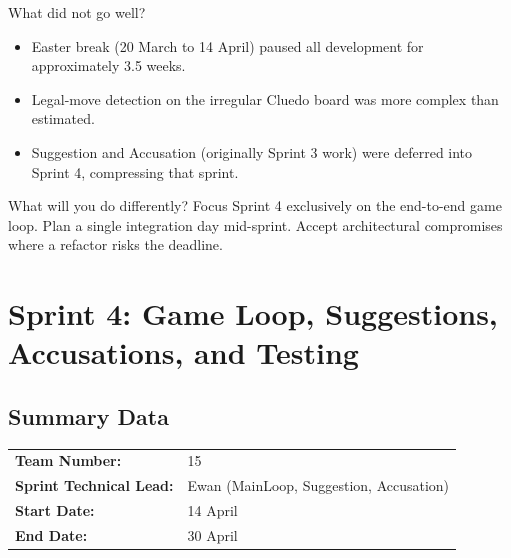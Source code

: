 What did not go well?
\begin{itemize}
    \item Easter break (20 March to 14 April) paused all development for approximately 3.5 weeks.
    \item Legal-move detection on the irregular Cluedo board was more complex than estimated.
    \item Suggestion and Accusation (originally Sprint 3 work) were deferred into Sprint 4, compressing that sprint.
\end{itemize}

What will you do differently? Focus Sprint 4 exclusively on the end-to-end game loop. Plan a single integration day mid-sprint. Accept architectural compromises where a refactor risks the deadline.

\section{Sprint 4: Game Loop, Suggestions, Accusations, and Testing}
\label{sec:sprint4}

\subsection*{Summary Data}
\begin{tabular}{ll}
\textbf{Team Number:} & 15 \\
\textbf{Sprint Technical Lead:} & Ewan (MainLoop, Suggestion, Accusation) \\
\textbf{Start Date:} & 14 April \\
\textbf{End Date:} & 30 April \\
\end{tabular}

